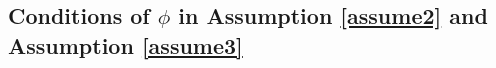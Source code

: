 \documentclass{amsart}
\numberwithin{equation}{section}
\begin{document}
 
 


 





 
 

 


% 
  

 


\subsection{Conditions of $\phi$ in Assumption \ref{assume2} and Assumption \ref{assume3}}\label{proofprop0320-2}
 
\end{document}
